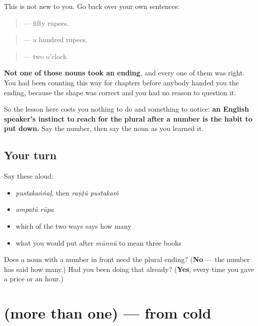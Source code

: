 \begin{grammarlens}[title={What you've built}]
This is not new to you. Go back over your own sentences:

\begin{quote}
\textbf{ } — fifty rupees.
\end{quote}

\begin{quote}
\textbf{ } — a hundred rupees.
\end{quote}

\begin{quote}
\textbf{ } — two o'clock.
\end{quote}

\textbf{Not one of those nouns took an ending}, and every one of them was right. You had been counting this way for chapters before anybody handed you the ending, because the shape was correct and you had no reason to question it.

So the lesson here costs you nothing to do and something to notice: \textbf{an English speaker's instinct to reach for the plural after a number is the habit to put down.} Say the number, then say the noun as you learned it.
\end{grammarlens}

\subsection*{Your turn}
Say these aloud:

\begin{itemize}
\raggedright
  \item \emph{pustakaṅṅaḷ}, then \emph{raṇṭŭ pustakaṁ}
  \item \emph{ampatŭ rūpa}
  \item which of the two ways says how many
  \item what you would put after \emph{mūnnŭ} to mean three books
\end{itemize}

\begin{tcolorbox}[breakable,colback=teal!4,colframe=teal!35!black,title={Before you move on}]
Does a noun with a number in front need the plural ending? (\textbf{No} — the number has said how many.) Had you been doing that already? (\textbf{Yes}, every time you gave a price or an hour.)
\end{tcolorbox}
\section[(more than one)]{(more than one) — from cold}

